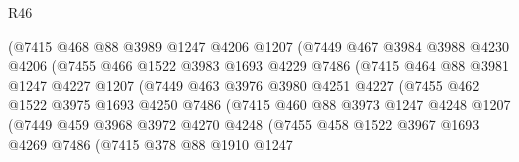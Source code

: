 \begin{lexlean}{R46}
\begin{coremodule}
                        (@7415
                          @468
                          @88
                          @3989
                          @1247
                          @4206
                          @1207
                          (@7449
                            @467
                            @3984
                            @3988
                            @4230
                            @4206
                            (@7455
                              @466
                              @1522
                              @3983
                              @1693
                              @4229
                              @7486
                              (@7415
                                @464
                                @88
                                @3981
                                @1247
                                @4227
                                @1207
                                (@7449
                                  @463
                                  @3976
                                  @3980
                                  @4251
                                  @4227
                                  (@7455
                                    @462
                                    @1522
                                    @3975
                                    @1693
                                    @4250
                                    @7486
                                    (@7415
                                      @460
                                      @88
                                      @3973
                                      @1247
                                      @4248
                                      @1207
                                      (@7449
                                        @459
                                        @3968
                                        @3972
                                        @4270
                                        @4248
                                        (@7455
                                          @458
                                          @1522
                                          @3967
                                          @1693
                                          @4269
                                          @7486
                                          (@7415
                                            @378
                                            @88
                                            @1910
                                            @1247

\end{coremodule}
\end{lexlean}
